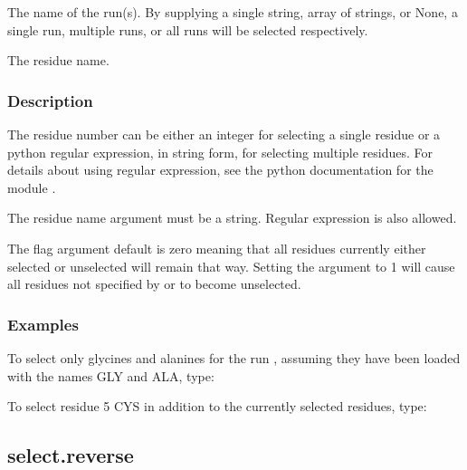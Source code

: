   The name of the run(s).  By supplying a single string, array of strings, or None, a single run, multiple runs, or all runs will be selected respectively.

  The residue name.


\subsubsection{Description}

The residue number can be either an integer for selecting a single residue or a python
regular expression, in string form, for selecting multiple residues.  For details about
using regular expression, see the python documentation for the module 
.

The residue name argument must be a string.  Regular expression is also allowed.

The 
 flag argument default is zero meaning that all residues currently either
selected or unselected will remain that way.  Setting the argument to 1 will cause all
residues not specified by 
 or 
 to become unselected.


\subsubsection{Examples}

To select only glycines and alanines for the run 
, assuming they have been loaded with
the names GLY and ALA, type:




To select residue 5 CYS in addition to the currently selected residues, type:








\newpage

\subsection{select.reverse}


